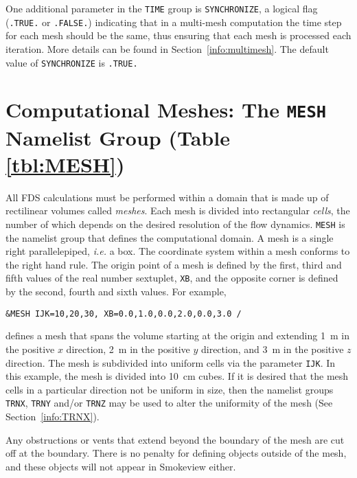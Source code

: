 \documentclass[11pt]{book}
\newcommand{\ct}{\tt\small}
\begin{document}
\noindent
One additional parameter in the {\ct TIME} group is {\ct SYNCHRONIZE}, a
logical flag ({\ct .TRUE.} or {\ct .FALSE.}) indicating that in a
multi-mesh computation the time step for each mesh should be the same, thus
ensuring that each mesh is processed each iteration. More details can
be found in Section~\ref{info:multimesh}. The default value of {\ct SYNCHRONIZE} is {\ct .TRUE.}

\newpage

\section{Computational Meshes: The \texorpdfstring{{\tt MESH}}{MESH} Namelist Group (Table \ref{tbl:MESH})}
\label{info:MESH}

All FDS calculations must be performed within a domain that is made up
of rectilinear volumes called {\em meshes}. Each mesh is divided into rectangular {\em cells},
the number of which depends on the desired resolution of the flow dynamics.
{\ct MESH} is the namelist group that defines the computational domain.
A mesh is a single right parallelepiped, {\em i.e.} a box.
The coordinate system within a mesh conforms to the right hand rule.
The origin point of a mesh is defined by the first, third
and fifth values of the real number sextuplet, {\ct XB}, and the opposite
corner is defined by the second, fourth and sixth values.
For example,

\footnotesize
\begin{verbatim}
&MESH IJK=10,20,30, XB=0.0,1.0,0.0,2.0,0.0,3.0 /
\end{verbatim}

\normalsize
\noindent
defines a mesh that spans the volume starting at the origin and extending 1~m in the positive
$x$ direction, 2~m in the positive $y$ direction, and 3~m in the positive $z$ direction.
The mesh is subdivided into uniform cells via the parameter
{\ct IJK}. In this example, the mesh is divided into 10~cm cubes.
If it is desired that the mesh cells in a particular direction not be uniform in size,
then the namelist groups {\ct TRNX}, {\ct TRNY} and/or {\ct TRNZ} may be used to alter the
uniformity of the mesh (See Section~\ref{info:TRNX}).

Any obstructions or vents that extend beyond the boundary of the mesh
are cut off at the boundary. There is no penalty for defining objects
outside of the mesh, and these objects will not appear in Smokeview either.
\end{document}
